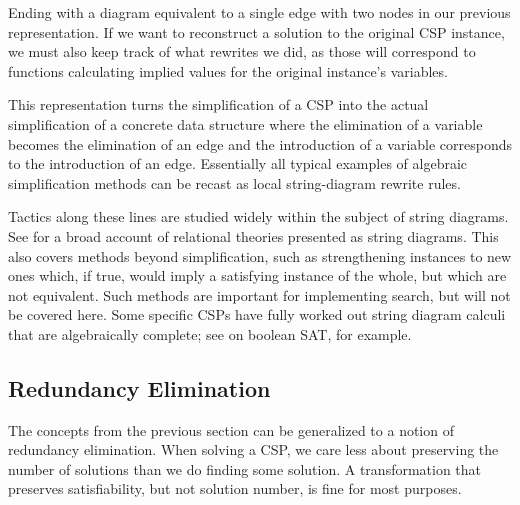 \begin{center}
\end{center}

Ending with a diagram equivalent to a single edge with two nodes in our previous representation. If we want to reconstruct a solution to the original CSP instance, we must also keep track of what rewrites we did, as those will correspond to functions calculating implied values for the original instance's variables.

This representation turns the simplification of a CSP into the actual simplification of a concrete data structure where the elimination of a variable becomes the elimination of an edge and the introduction of a variable corresponds to the introduction of an edge. Essentially all typical examples of algebraic simplification methods can be recast as local string-diagram rewrite rules. 

Tactics along these lines are studied widely within the subject of string diagrams. See \citep{bonchi2017functorial} for a broad account of relational theories presented as string diagrams. This also covers methods beyond simplification, such as strengthening instances to new ones which, if true, would imply a satisfying instance of the whole, but which are not equivalent. Such methods are important for implementing search, but will not be covered here. Some specific CSPs have fully worked out string diagram calculi that are algebraically complete; see \citep{gu2023complete} on boolean SAT, for example.

\subsection{Redundancy Elimination}\label{sec:redundancy}

The concepts from the previous section can be generalized to a notion of redundancy elimination. When solving a CSP, we care less about preserving the number of solutions than we do finding some solution. A transformation that preserves satisfiability, but not solution number, is fine for most purposes.

